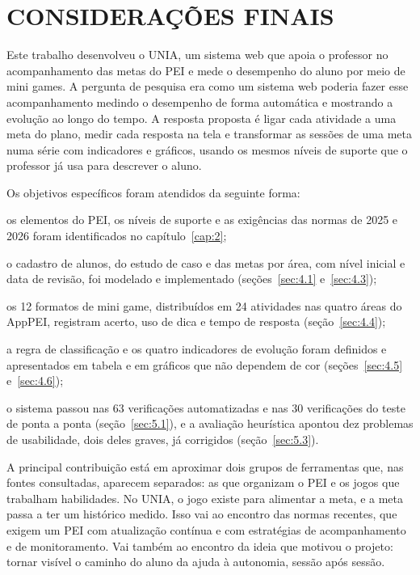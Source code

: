 
\chapter{CONSIDERAÇÕES FINAIS}\label{cap:6}

Este trabalho desenvolveu o UNIA, um sistema web que apoia o professor no acompanhamento das metas do PEI e mede o desempenho do aluno por meio de mini games. A pergunta de pesquisa era como um sistema web poderia fazer esse acompanhamento medindo o desempenho de forma automática e mostrando a evolução ao longo do tempo. A resposta proposta é ligar cada atividade a uma meta do plano, medir cada resposta na tela e transformar as sessões de uma meta numa série com indicadores e gráficos, usando os mesmos níveis de suporte que o professor já usa para descrever o aluno.

Os objetivos específicos foram atendidos da seguinte forma:

\begin{alineasIFTO}
  \item os elementos do PEI, os níveis de suporte e as exigências das normas de 2025 e 2026 foram identificados no capítulo~\ref{cap:2};
  \item o cadastro de alunos, do estudo de caso e das metas por área, com nível inicial e data de revisão, foi modelado e implementado (seções~\ref{sec:4.1} e~\ref{sec:4.3});
  \item os 12 formatos de mini game, distribuídos em 24 atividades nas quatro áreas do AppPEI, registram acerto, uso de dica e tempo de resposta (seção~\ref{sec:4.4});
  \item a regra de classificação e os quatro indicadores de evolução foram definidos e apresentados em tabela e em gráficos que não dependem de cor (seções~\ref{sec:4.5} e~\ref{sec:4.6});
  \item o sistema passou nas 63 verificações automatizadas e nas 30 verificações do teste de ponta a ponta (seção~\ref{sec:5.1}), e a avaliação heurística apontou dez problemas de usabilidade, dois deles graves, já corrigidos (seção~\ref{sec:5.3}).
\end{alineasIFTO}

A principal contribuição está em aproximar dois grupos de ferramentas que, nas fontes consultadas, aparecem separados: as que organizam o PEI e os jogos que trabalham habilidades. No UNIA, o jogo existe para alimentar a meta, e a meta passa a ter um histórico medido. Isso vai ao encontro das normas recentes, que exigem um PEI com atualização contínua e com estratégias de acompanhamento e de monitoramento. Vai também ao encontro da ideia que motivou o projeto: tornar visível o caminho do aluno da ajuda à autonomia, sessão após sessão.

